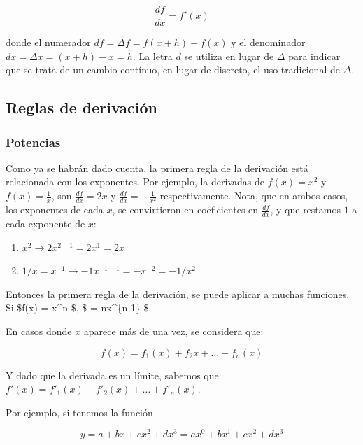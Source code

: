 \documentclass[
]{book}
\providecommand{\tightlist}{%
  \setlength{\itemsep}{0pt}\setlength{\parskip}{0pt}}
\begin{document}
\begin{equation}
\frac{df}{dx} = f'(x) \label{eq:Leibniz}
\end{equation}

donde el numerador \(df = \Delta f = f(x + h) - f(x)\) y el denominador \(dx = \Delta x = (x+h) - x = h\). La letra \(d\) se utiliza en lugar de \(\Delta\) para indicar que se trata de un cambio contínuo, en lugar de discreto, el uso tradicional de \(\Delta\).

\hypertarget{reglas-de-derivaciuxf3n}{%
\subsection{Reglas de derivación}\label{reglas-de-derivaciuxf3n}}

\hypertarget{potencias}{%
\subsubsection{Potencias}\label{potencias}}

Como ya se habrán dado cuenta, la primera regla de la derivación está relacionada con los exponentes. Por ejemplo, la derivadas de \(f(x) = x^2\) y \(f(x) = \frac{1}{x}\), son \(\frac{df}{dx} = 2x\) y \(\frac{df}{dx} = - \frac{1}{x^2}\) respectivamente. Nota, que en ambos casos, los exponentes de cada \(x\), se convirtieron en coeficientes en \(\frac{df}{dx}\), y que restamos \(1\) a cada exponente de \(x\):

\begin{enumerate}
\def\labelenumi{\arabic{enumi}.}
\tightlist
\item
  \(x^2 \rightarrow 2x^{2-1} = 2x^1 = 2x\)
\item
  \(1/x = x^{-1} \rightarrow -1x^{-1-1} = -x^{-2} = - 1/x^2\)
\end{enumerate}

Entonces la primera regla de la derivación, se puede aplicar a muchas funciones. Si \$f(x) = x\^{}n \$, \$ = nx\^{}\{n-1\} \$.

En casos donde \(x\) aparece más de una vez, se considera que:

\[f(x) = f_1(x) + f_2{x} + \dots + f_n(x)\]

Y dado que la derivada es un límite, sabemos que \(f'(x) = f'_1(x) + f'_2(x) + \dots + f'_n(x)\).

Por ejemplo, si tenemos la función

\[y = a + bx + cx^2 + dx^3 = ax^0 + bx^1 + cx^2 + dx^3\]
\end{document}
